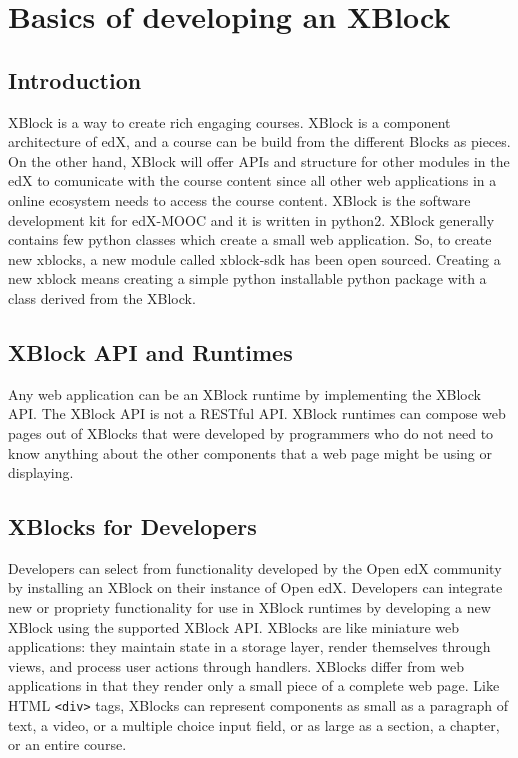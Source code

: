 \chapter{Basics of developing an XBlock}
\section{Introduction}
XBlock is a way to create rich engaging courses. XBlock is a component architecture of edX, and a
course can be build from the different Blocks as pieces. On the other hand, XBlock will offer
APIs and structure for other modules in the edX to comunicate with the course content since all
other web applications in a online ecosystem needs to access the course content.\newline
XBlock is the software development kit for edX-MOOC and it is written in python2. XBlock
generally contains few python classes which create a small web application. So, to create new
xblocks, a new module called xblock-sdk has been open sourced. Creating a new xblock means
creating a simple python installable python package with a class derived from the XBlock.

\section{XBlock API and Runtimes}
Any web application can be an XBlock runtime by implementing the XBlock API. The
XBlock API is not a RESTful API. XBlock runtimes can compose web pages out of XBlocks that
were developed by programmers who do not need to know anything about the other components
that a web page might be using or displaying.

\section{XBlocks for Developers}
Developers can select from functionality developed by the Open edX community by installing an
XBlock on their instance of Open edX. Developers can integrate new or propriety functionality for
use in XBlock runtimes by developing a new XBlock using the supported XBlock API.\newline\newline
XBlocks are like miniature web applications: they maintain state in a storage layer, render
themselves through views, and process user actions through handlers. XBlocks differ from web
applications in that they render only a small piece of a complete web page. Like HTML \verb=<div>= tags,
XBlocks can represent components as small as a paragraph of text, a video, or a multiple choice
input field, or as large as a section, a chapter, or an entire course.
